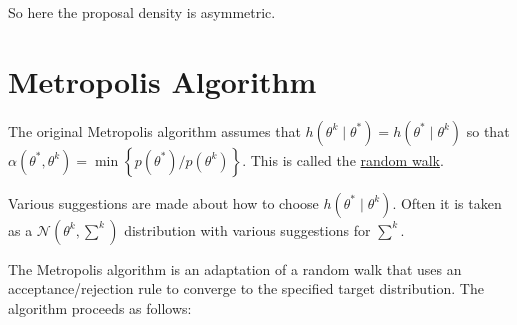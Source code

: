 \documentclass[lecture,12pt,]{pcms-l}
\numberwithin{section}{chapter}
\numberwithin{equation}{chapter}
\theoremstyle{plain}
\theoremstyle{definition}
\theoremstyle{definition}
\begin{document}
So here the proposal density is asymmetric. 
\section{Metropolis Algorithm}
The original Metropolis algorithm assumes that $h(\theta^k \mid \theta^*)= h(\theta^* \mid \theta^k)$ so that $\alpha(\theta^*,\theta^k)= \min\left \{ p(\theta^*)/p(\theta^k)  \right \} $. This is called the \underline{random walk}. 

Various suggestions are made about how to choose $h(\theta^* \mid \theta^k)$. Often it is taken as a $\mathcal{N}(\theta^k, \sum^k)$ distribution with various suggestions for $\sum^k$.

The Metropolis algorithm is an adaptation of a random walk that uses an acceptance/rejection rule to converge to the specified target distribution. The algorithm proceeds as follows:
\end{document}
